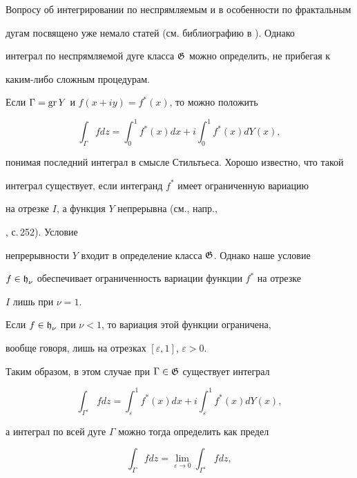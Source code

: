 Вопросу об интегрировании по неспрямляемым и в особенности по фрактальным


дугам посвящено уже немало статей (см. библиографию в \cite{K}). Однако


интеграл по неспрямляемой дуге класса $\operatorname{\frak G}$ можно определить, не прибегая к


каким-либо сложным процедурам.





Если $\Gamma = \operatorname{gr} Y$ и $f(x+iy) = f^{*}(x)$, то можно положить


$$


\int_{\Gamma}{fdz} = \int_{0}^{1}{f^{*}(x)dx} +


i\int_{0}^{1}{f^{*}(x)dY(x)},


$$


понимая последний интеграл в смысле Стильтьеса. Хорошо известно, что такой


интеграл существует, если интегранд $f^{*}$ имеет ограниченную вариацию


на отрезке $I$, а функция $Y$ непрерывна (см., напр.,


\cite{N}, с.\,252). Условие


непрерывности $Y$ входит в определение класса $\operatorname{\frak G}$. Однако наше условие


$f\in\operatorname{\frak h}_{\nu}$ обеспечивает ограниченность вариации функции $f^*$ на отрезке


$I$ лишь при $\nu=1$.





Если $f\in\operatorname{\frak h}_{\nu}$ при $\nu<1$, то вариация этой функции ограничена,


вообще говоря, лишь на отрезках $[\varepsilon, 1]$, $\varepsilon > 0$.


Таким образом, в этом случае при $\Gamma\in\operatorname{\frak G}$ существует интеграл


$$


\int_{\Gamma^\varepsilon}{fdz} = \int_{\varepsilon}^{1}{f^{*}(x)dx} +


i\int_{\varepsilon}^{1}{f^{*}(x)dY(x)},


$$


а интеграл по всей дуге $\Gamma$ можно тогда определить как предел


$$


\int_{\Gamma}{fdz} =


\lim_{\varepsilon\to 0}{\int_{\Gamma^\varepsilon}{fdz}},


$$


